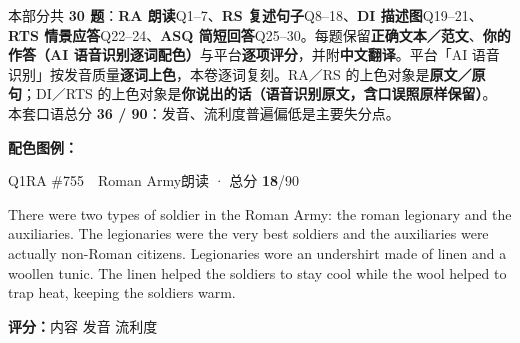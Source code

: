 
\vspace{1mm}
{\small\color{gray} 本部分共 \textbf{30 题}：\textbf{RA 朗读}Q1--7、\textbf{RS 复述句子}Q8--18、\textbf{DI 描述图}Q19--21、\textbf{RTS 情景应答}Q22--24、\textbf{ASQ 简短回答}Q25--30。每题保留\textbf{正确文本／范文}、\textbf{你的作答（AI 语音识别逐词配色）}与平台\textbf{逐项评分}，并附\textbf{中文翻译}。平台「AI 语音识别」按发音质量\textbf{逐词上色}，本卷逐词复刻。RA／RS 的上色对象是\textbf{原文／原句}；DI／RTS 的上色对象是\textbf{你说出的话（语音识别原文，含口误照原样保留）}。
本套口语总分 \textbf{36 / 90}：发音、流利度普遍偏低是主要失分点。}

\vspace{1mm}
{\small\color{gray}\textbf{配色图例：}\asrlegend}
\vspace{2mm}


\begin{qblock}{Q1\quad RA \#755\ \ Roman Army}{朗读 · 总分 \textcolor{cAccent}{\bfseries 18}/90}
\begin{promptbox}
There were two types of soldier in the Roman Army: the roman legionary and the auxiliaries. The legionaries were the very best soldiers and the auxiliaries were actually non-Roman citizens. Legionaries wore an undershirt made of linen and a woollen tunic. The linen helped the soldiers to stay cool while the wool helped to trap heat, keeping the soldiers warm.
\end{promptbox}
\asrlegend
\begin{asrbox}
     \pse {}     \pse {}          \pse {}        \pse {}                   \pse {}           \pse {}   
\end{asrbox}
\smallskip
{\small\textbf{评分：}内容  \quad\textperiodcentered\quad 发音  \quad\textperiodcentered\quad 流利度 }
\end{qblock}

